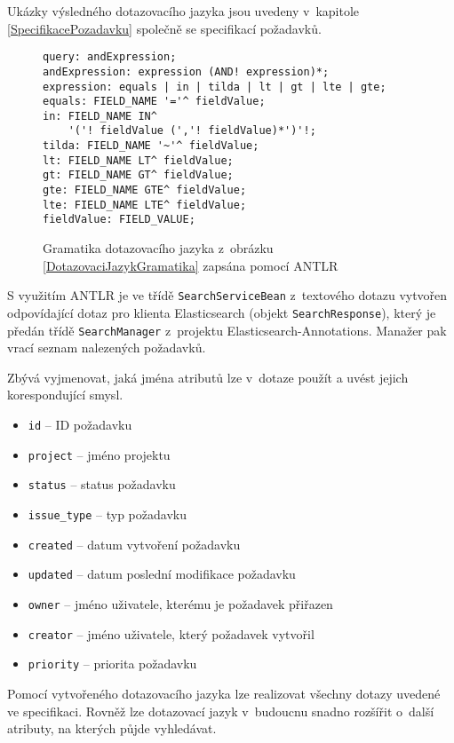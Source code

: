 \documentclass[11pt,oneside]{fithesis2}
\begin{document}
Ukázky výsledného dotazovacího jazyka jsou uvedeny v~kapitole \ref{SpecifikacePozadavku} společně se specifikací požadavků.

\begin{figure}[htb]
\begin{lstlisting}[frame=single]
query: andExpression;
andExpression: expression (AND! expression)*;
expression: equals | in | tilda | lt | gt | lte | gte;
equals: FIELD_NAME '='^ fieldValue;
in: FIELD_NAME IN^
    '('! fieldValue (','! fieldValue)*')'!;
tilda: FIELD_NAME '~'^ fieldValue;
lt: FIELD_NAME LT^ fieldValue;
gt: FIELD_NAME GT^ fieldValue;
gte: FIELD_NAME GTE^ fieldValue;
lte: FIELD_NAME LTE^ fieldValue;
fieldValue: FIELD_VALUE;
\end{lstlisting}
\caption{Gramatika dotazovacího jazyka z~obrázku \ref{DotazovaciJazykGramatika} zapsána pomocí ANTLR}
\label{DotazovaciJazykGramatikaAntlr}
\end{figure}

S využitím ANTLR je ve třídě \texttt{SearchServiceBean} z~textového dotazu vytvořen odpovídající dotaz pro klienta Elasticsearch (objekt \texttt{SearchResponse}), který je předán třídě \texttt{SearchManager} z~projektu Elasticsearch-Annotations. Manažer pak vrací seznam nalezených požadavků.

Zbývá vyjmenovat, jaká jména atributů lze v~dotaze použít a uvést jejich korespondující smysl.

\begin{itemize}
	\item \texttt{id} -- ID požadavku
	\item \texttt{project} -- jméno projektu
	\item \texttt{status} -- status požadavku
	\item \texttt{issue\_type} -- typ požadavku
	\item \texttt{created} -- datum vytvoření požadavku
	\item \texttt{updated} -- datum poslední modifikace požadavku
	\item \texttt{owner} -- jméno uživatele, kterému je požadavek přiřazen
	\item \texttt{creator} -- jméno uživatele, který požadavek vytvořil
	\item \texttt{priority} -- priorita požadavku
\end{itemize}

Pomocí vytvořeného dotazovacího jazyka lze realizovat všechny dotazy uvedené ve specifikaci. Rovněž lze dotazovací jazyk v~budoucnu snadno rozšířit o~další atributy, na kterých půjde vyhledávat.
\end{document}
